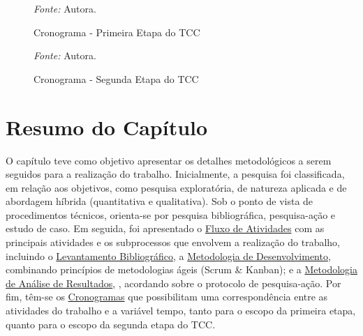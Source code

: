 \begin{figure}[h!]
	\centering
	\caption{Cronograma - Primeira Etapa do TCC}
	\begin{tablenotes}[flushleft]
		\centering
		\item \textit{Fonte:} Autora.
	\end{tablenotes}
	\label{fig06}
\end{figure}

\begin{figure}[h!]
	\centering
	\caption{Cronograma - Segunda Etapa do TCC}
	\begin{tablenotes}[flushleft]
		\centering
		\item \textit{Fonte:} Autora.
	\end{tablenotes}
	\label{fig07}
\end{figure}

\section{Resumo do Capítulo}
\label{sec:Resumo do Capitulo}
O capítulo teve como objetivo apresentar os detalhes metodológicos a serem seguidos para a realização do trabalho. Inicialmente, a pesquisa foi classificada, em relação aos objetivos, como pesquisa exploratória, de natureza aplicada 
e de abordagem híbrida (quantitativa e qualitativa). Sob o ponto de vista de procedimentos técnicos, orienta-se por pesquisa bibliográfica, pesquisa-ação e estudo de caso. Em seguida, foi apresentado o \hyperref[sec:Fluxo de Atividades]{Fluxo de Atividades}
com as principais atividades e os subprocessos que envolvem a realização do trabalho, incluindo o \hyperref[sec:Levantamento Bibliografico]{Levantamento Bibliográfico}, a \hyperref[sec:Metodologia de Desenvolvimento]{Metodologia de Desenvolvimento}, combinando princípios de metodologias ágeis (Scrum \& Kanban); e a 
\hyperref[sec:Metodologia de Analise de Resultados]{Metodologia de Análise de Resultados}, , acordando sobre o protocolo de pesquisa-ação. Por fim, têm-se os \hyperref[sec:Cronograma]{Cronogramas} que possibilitam uma correspondência entre as atividades do trabalho e a variável tempo, tanto para o escopo da primeira 
etapa, quanto para o escopo da segunda etapa do TCC.
